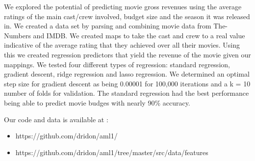 \documentclass[conference]{IEEEtran}
\begin{document}




\maketitle


We explored the potential of predicting movie gross revenues using the average ratings of the main
cast/crew involved, budget size and the season it was released in. We created a data set by parsing and 
combining movie data from The-Numbers and IMDB. We created maps to take the cast and crew to a real value indicative 
of the average rating that they achieved over all their movies. Using this we created regression predictors
that yield the revenue of the movie given our mappings. We tested four different types of 
regression: standard regression, gradient descent, ridge regression and lasso regression. We determined 
an optimal step size for gradient descent as being 0.00001 for 100,000 iterations and a k = 10 number 
of folds for validation. The standard regression had the best performance being able to predict movie budges with nearly 90\% accuracy.

Our code and data is available at :
\begin{itemize}
\item https://github.com/dridon/aml1/
\item https://github.com/dridon/aml1/tree/master/src/data/features 
\end{itemize}





%
\IEEEpeerreviewmaketitle
\end{document}
